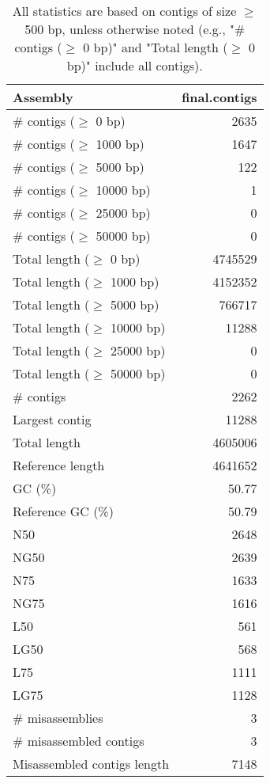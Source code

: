 \documentclass[12pt,a4paper]{article}
\begin{document}
\begin{table}[ht]
\begin{center}
\caption{All statistics are based on contigs of size $\geq$ 500 bp, unless otherwise noted (e.g., "\# contigs ($\geq$ 0 bp)" and "Total length ($\geq$ 0 bp)" include all contigs).}
\begin{tabular}{|l*{1}{|r}|}
\hline
Assembly & final.contigs \\ \hline
\# contigs ($\geq$ 0 bp) & 2635 \\ \hline
\# contigs ($\geq$ 1000 bp) & 1647 \\ \hline
\# contigs ($\geq$ 5000 bp) & 122 \\ \hline
\# contigs ($\geq$ 10000 bp) & 1 \\ \hline
\# contigs ($\geq$ 25000 bp) & 0 \\ \hline
\# contigs ($\geq$ 50000 bp) & 0 \\ \hline
Total length ($\geq$ 0 bp) & 4745529 \\ \hline
Total length ($\geq$ 1000 bp) & 4152352 \\ \hline
Total length ($\geq$ 5000 bp) & 766717 \\ \hline
Total length ($\geq$ 10000 bp) & 11288 \\ \hline
Total length ($\geq$ 25000 bp) & 0 \\ \hline
Total length ($\geq$ 50000 bp) & 0 \\ \hline
\# contigs & 2262 \\ \hline
Largest contig & 11288 \\ \hline
Total length & 4605006 \\ \hline
Reference length & 4641652 \\ \hline
GC (\%) & 50.77 \\ \hline
Reference GC (\%) & 50.79 \\ \hline
N50 & 2648 \\ \hline
NG50 & 2639 \\ \hline
N75 & 1633 \\ \hline
NG75 & 1616 \\ \hline
L50 & 561 \\ \hline
LG50 & 568 \\ \hline
L75 & 1111 \\ \hline
LG75 & 1128 \\ \hline
\# misassemblies & 3 \\ \hline
\# misassembled contigs & 3 \\ \hline
Misassembled contigs length & 7148 \\ \hline

\end{tabular}
\end{center}
\end{table}
\end{document}
